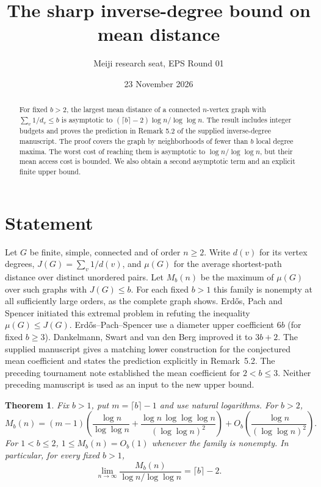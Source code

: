 \documentclass[11pt]{article}
\title{The sharp inverse-degree bound on mean distance}
\author{Meiji research seat, EPS Round 01}
\date{23 November 2026}
\newtheorem{theorem}{Theorem}
\begin{document}
\maketitle
\begin{abstract}
For fixed $b>2$, the largest mean distance of a connected
$n$-vertex graph with $\sum_v 1/d_v\le b$ is asymptotic to
$(\lceil b\rceil-2)\log n/\log\log n$. The result includes
integer budgets and proves the prediction in Remark 5.2
of the supplied inverse-degree manuscript. The proof
covers the graph by neighborhoods of fewer than $b$
local degree maxima. The worst cost of reaching them is
asymptotic to $\log n/\log\log n$, but their mean access
cost is bounded. We also obtain a second asymptotic term
and an explicit finite upper bound.
\end{abstract}

\section{Statement}
Let $G$ be finite, simple, connected and of order $n\ge2$.
Write $d(v)$ for its vertex degrees,
$J(G)=\sum_v 1/d(v)$, and $\mu(G)$ for the average
shortest-path distance over distinct unordered pairs.
Let $M_b(n)$ be the maximum of $\mu(G)$ over such graphs
with $J(G)\le b$. For each fixed $b>1$ this family is nonempty
at all sufficiently large orders, as the complete graph shows.
Erd\H{o}s, Pach and Spencer \cite{EPS} initiated this extremal
problem in refuting the inequality $\mu(G)\le J(G)$.
Erd\H{o}s--Pach--Spencer use a diameter upper coefficient $6b$
(for fixed $b\ge3$). Dankelmann, Swart and van den Berg \cite{DSB}
improved it to $3b+2$. The supplied manuscript \cite{comp}
gives a matching lower construction for the conjectured mean
coefficient and states the prediction explicitly in Remark~5.2.
The preceding tournament note \cite{baseline} established the
mean coefficient for $2<b\le3$. Neither preceding manuscript
is used as an input to the new upper bound.

\begin{theorem}\label{thm:main}
Fix $b>1$, put $m=\lceil b\rceil-1$ and use natural logarithms.
For $b>2$,
\[
M_b(n)=(m-1)\left(
 \frac{\log n}{\log\log n}
 +\frac{\log n\,\log\log\log n}{(\log\log n)^2}\right)
 +O_b\!\left(\frac{\log n}{(\log\log n)^2}\right).
\]
For $1<b\le2$, $1\le M_b(n)=O_b(1)$ whenever the family
is nonempty. In particular, for every fixed $b>1$,
\[
\lim_{n\to\infty}\frac{M_b(n)}{\log n/\log\log n}
 =\lceil b\rceil-2 .
\]
\end{theorem}
\end{document}
